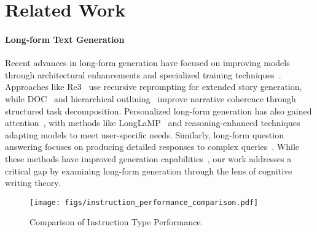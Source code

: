 \section{Related Work}
\paragraph{Long-form Text Generation}
Recent advances in long-form generation have focused on improving models through architectural enhancements and specialized training techniques~\cite{salemi2025experteffectiveexplainableevaluation,que2024hellobenchevaluatinglongtext,liu-etal-2023-task,Li2023TeachLT}. Approaches like Re3~\cite{yang-etal-2022-re3} use recursive reprompting for extended story generation, while DOC~\cite{yang-etal-2023-doc} and hierarchical outlining~\cite{wang2024generatinglongformstoryusing} improve narrative coherence through structured task decomposition. Personalized long-form generation has also gained attention~\cite{salemi2025experteffectiveexplainableevaluation,wang-etal-2024-learning-personalized}, with methods like LongLaMP~\cite{kumar2024longlampbenchmarkpersonalizedlongform} and reasoning-enhanced techniques~\cite{salemi2025reasoningenhancedselftraininglongformpersonalized} adapting models to meet user-specific needs. Similarly, long-form question answering focuses on producing detailed responses to complex queries~\cite{dasigi-etal-2021-dataset,stelmakh-etal-2022-asqa,pmlr-v202-lee23n,tan-etal-2024-proxyqa}. While these methods have improved generation capabilities~\cite{wu2024longgenbench,que2024hellobenchevaluatinglongtext}, our work addresses a critical gap by examining long-form generation through the lens of cognitive writing theory.


\begin{figure}[t!]
\centering
  \texttt{[image: figs/instruction\_performance\_comparison.pdf]} 
  \caption {Comparison of Instruction Type Performance.}
  \label{compt}
\end{figure}

